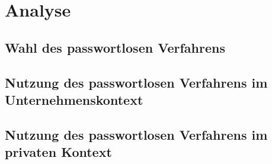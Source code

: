 \chapter{Analyse}

\section{Wahl des passwortlosen Verfahrens}

\section{Nutzung des passwortlosen Verfahrens im Unternehmenskontext}

\section{Nutzung des passwortlosen Verfahrens im privaten Kontext}